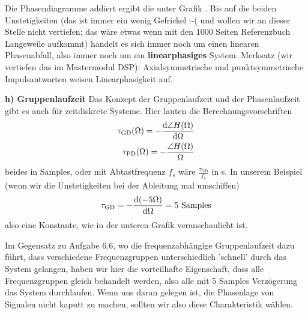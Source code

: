 Die Phasendiagramme addiert ergibt die unter Grafik
. Bis auf die beiden Unstetigkeiten
(das ist immer ein wenig Gefrickel :-( und wollen wir an dieser
Stelle nicht vertiefen; das wäre etwas wenn mit den 1000 Seiten
Referenzbuch \cite{Oppenheim2010, Oppenheim2004} Langeweile aufkommt)
handelt es sich immer noch um einen linearen Phasenabfall, also immer
noch um ein \textbf{linearphasiges} System.
%
Merksatz (wir vertiefen das im Mastermodul DSP): Axialsymmetrische und
punktsymmetrische Impulsantworten weisen Linearphasigkeit auf.

\textbf{h) Gruppenlaufzeit}
Das Konzept der Gruppenlaufzeit und der Phasenlaufzeit
gibt es auch für zeitdiskrete Systeme.
Hier lauten die Berechnungsvorschriften
\begin{align}
\tau_\text{GD}(\Omega) = -\frac{\mathrm{d} \angle H(\Omega)}{\mathrm{d} \Omega}\\
\tau_\text{PD}(\Omega) = -\frac{\angle H(\Omega)}{\Omega}
\end{align}
beides in Samples, oder mit Abtastfrequenz $f_s$ wäre
$\frac{\tau_\text{GD}}{f_s}$ in s.
%
In unserem Beispiel (wenn wir die Unstetigkeiten bei der Ableitung mal umschiffen)
\begin{align}
\tau_\text{GD} = -\frac{\mathrm{d} (-5 \Omega)}{\mathrm{d} \Omega} = 5\text{ Samples}\\
\end{align}
also eine Konstante, wie in der unteren Grafik veranschaulicht ist.
\begin{center}
\end{center}
%
Im Gegensatz zu Aufgabe 6.6, wo die frequenzabhängige Gruppenlaufzeit dazu führt,
dass verschiedene Frequenzgruppen unterschiedlich 'schnell' durch das System gelangen,
haben wir hier die vorteilhafte Eigenschaft, dass alle Frequenzgruppen
gleich behandelt werden, also alle mit 5 Samples Verzögerung das System durchlaufen.
Wenn uns daran gelegen ist, die Phasenlage von Signalen nicht kaputt
zu machen, sollten wir also diese Charakteristik wählen.
%

